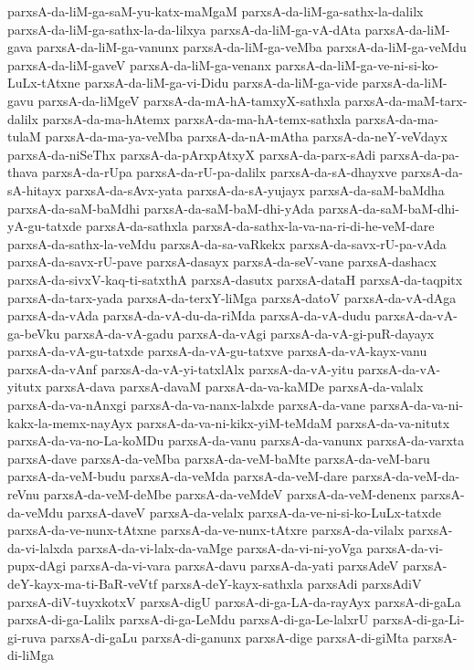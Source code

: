 {parxsA-da-liM-ga-saM-yu-katx-maMgaM
parxsA-da-liM-ga-sathx-la-dalilx
parxsA-da-liM-ga-sathx-la-da-lilxya
parxsA-da-liM-ga-vA-dAta
parxsA-da-liM-gava
parxsA-da-liM-ga-vanunx
parxsA-da-liM-ga-veMba
parxsA-da-liM-ga-veMdu
parxsA-da-liM-gaveV
parxsA-da-liM-ga-venanx
parxsA-da-liM-ga-ve-ni-si-ko-LuLx-tAtxne
parxsA-da-liM-ga-vi-Didu
parxsA-da-liM-ga-vide
parxsA-da-liM-gavu
parxsA-da-liMgeV
parxsA-da-mA-hA-tamxyX-sathxla
parxsA-da-maM-tarx-dalilx
parxsA-da-ma-hAtemx
parxsA-da-ma-hA-temx-sathxla
parxsA-da-ma-tulaM
parxsA-da-ma-ya-veMba
parxsA-da-nA-mAtha
parxsA-da-neY-veVdayx
parxsA-da-niSeThx
parxsA-da-pArxpAtxyX
parxsA-da-parx-sAdi
parxsA-da-pa-thava
parxsA-da-rUpa
parxsA-da-rU-pa-dalilx
parxsA-da-sA-dhayxve
parxsA-da-sA-hitayx
parxsA-da-sAvx-yata
parxsA-da-sA-yujayx
parxsA-da-saM-baMdha
parxsA-da-saM-baMdhi
parxsA-da-saM-baM-dhi-yAda
parxsA-da-saM-baM-dhi-yA-gu-tatxde
parxsA-da-sathxla
parxsA-da-sathx-la-va-na-ri-di-he-veM-dare
parxsA-da-sathx-la-veMdu
parxsA-da-sa-vaRkekx
parxsA-da-savx-rU-pa-vAda
parxsA-da-savx-rU-pave
parxsA-dasayx
parxsA-da-seV-vane
parxsA-dashacx
parxsA-da-sivxV-kaq-ti-satxthA
parxsA-dasutx
parxsA-dataH
parxsA-da-taqpitx
parxsA-da-tarx-yada
parxsA-da-terxY-liMga
parxsA-datoV
parxsA-da-vA-dAga
parxsA-da-vAda
parxsA-da-vA-du-da-riMda
parxsA-da-vA-dudu
parxsA-da-vA-ga-beVku
parxsA-da-vA-gadu
parxsA-da-vAgi
parxsA-da-vA-gi-puR-dayayx
parxsA-da-vA-gu-tatxde
parxsA-da-vA-gu-tatxve
parxsA-da-vA-kayx-vanu
parxsA-da-vAnf
parxsA-da-vA-yi-tatxlAlx
parxsA-da-vA-yitu
parxsA-da-vA-yitutx
parxsA-dava
parxsA-davaM
parxsA-da-va-kaMDe
parxsA-da-valalx
parxsA-da-va-nAnxgi
parxsA-da-va-nanx-lalxde
parxsA-da-vane
parxsA-da-va-ni-kakx-la-memx-nayAyx
parxsA-da-va-ni-kikx-yiM-teMdaM
parxsA-da-va-nitutx
parxsA-da-va-no-La-koMDu
parxsA-da-vanu
parxsA-da-vanunx
parxsA-da-varxta
parxsA-dave
parxsA-da-veMba
parxsA-da-veM-baMte
parxsA-da-veM-baru
parxsA-da-veM-budu
parxsA-da-veMda
parxsA-da-veM-dare
parxsA-da-veM-da-reVnu
parxsA-da-veM-deMbe
parxsA-da-veMdeV
parxsA-da-veM-denenx
parxsA-da-veMdu
parxsA-daveV
parxsA-da-velalx
parxsA-da-ve-ni-si-ko-LuLx-tatxde
parxsA-da-ve-nunx-tAtxne
parxsA-da-ve-nunx-tAtxre
parxsA-da-vilalx
parxsA-da-vi-lalxda
parxsA-da-vi-lalx-da-vaMge
parxsA-da-vi-ni-yoVga
parxsA-da-vi-pupx-dAgi
parxsA-da-vi-vara
parxsA-davu
parxsA-da-yati
parxsAdeV
parxsA-deY-kayx-ma-ti-BaR-veVtf
parxsA-deY-kayx-sathxla
parxsAdi
parxsAdiV
parxsA-diV-tuyxkotxV
parxsA-digU
parxsA-di-ga-LA-da-rayAyx
parxsA-di-gaLa
parxsA-di-ga-Lalilx
parxsA-di-ga-LeMdu
parxsA-di-ga-Le-lalxrU
parxsA-di-ga-Li-gi-ruva
parxsA-di-gaLu
parxsA-di-ganunx
parxsA-dige
parxsA-di-giMta
parxsA-di-liMga
}
